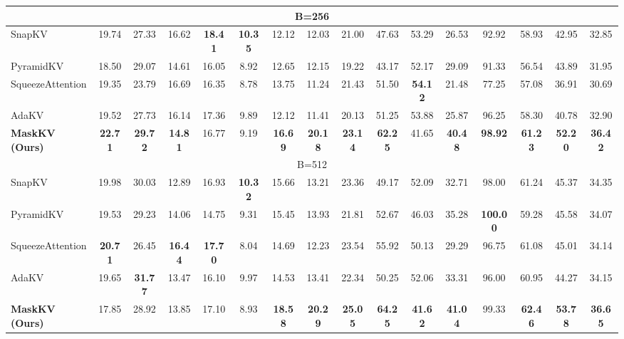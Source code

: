 \begin{table*}[t!]
{\begin{tabular}{@{}l*{15}{c}@{}}
        \midrule
        \multicolumn{16}{c}{\small B=256} \\
        \midrule
        SnapKV & 19.74 & 27.33 & 16.62 & \textbf{18.41} & \textbf{10.35} & 12.12 & 12.03 & 21.00 & 47.63 & 53.29 & 26.53 & 92.92 & 58.93 & 42.95 & 32.85 \\
        PyramidKV & 18.50 & 29.07 & 14.61 & 16.05 & 8.92 & 12.65 & 12.15 & 19.22 & 43.17 & 52.17 & 29.09 & 91.33 & 56.54 & 43.89 & 31.95 \\
        SqueezeAttention & 19.35 & 23.79 & 16.69 & 16.35 & 8.78 & 13.75 & 11.24 & 21.43 & 51.50 & \textbf{54.12} & 21.48 & 77.25 & 57.08 & 36.91 & 30.69 \\
        AdaKV & 19.52 & 27.73 & 16.14 & 17.36 & 9.89 & 12.12 & 11.41 & 20.13 & 51.25 & 53.88 & 25.87 & 96.25 & 58.30 & 40.78 & 32.90 \\
        \rowcolor{lightgreen} \textbf{MaskKV (Ours)} & \textbf{22.71} & \textbf{29.72} & \textbf{14.81} & 16.77 & 9.19 & \textbf{16.69} & \textbf{20.18} & \textbf{23.14} & \textbf{62.25} & 41.65 & \textbf{40.48} & \textbf{98.92} & \textbf{61.23} & \textbf{52.20} & \textbf{36.42} \\
        \midrule
        \multicolumn{16}{c}{\small B=512} \\
        \midrule
        SnapKV & 19.98 & 30.03 & 12.89 & 16.93 & \textbf{10.32} & 15.66 & 13.21 & 23.36 & 49.17 & 52.09 & 32.71 & 98.00 & 61.24 & 45.37 & 34.35 \\
        PyramidKV & 19.53 & 29.23 & 14.06 & 14.75 & 9.31 & 15.45 & 13.93 & 21.81 & 52.67 & 46.03 & 35.28 & \textbf{100.00} & 59.28 & 45.58 & 34.07 \\
        SqueezeAttention & \textbf{20.71} & 26.45 & \textbf{16.44} & \textbf{17.70} & 8.04 & 14.69 & 12.23 & 23.54 & 55.92 & 50.13 & 29.29 & 96.75 & 61.08 & 45.01 & 34.14 \\
        AdaKV & 19.65 & \textbf{31.77} & 13.47 & 16.10 & 9.97 & 14.53 & 13.41 & 22.34 & 50.25 & 52.06 & 33.31 & 96.00 & 60.95 & 44.27 & 34.15 \\
        \rowcolor{lightgreen} \textbf{MaskKV (Ours)} & 17.85 & 28.92 & 13.85 & 17.10 & 8.93 & \textbf{18.58} & \textbf{20.29} & \textbf{25.05} & \textbf{64.25} & \textbf{41.62} & \textbf{41.04} & 99.33 & \textbf{62.46} & \textbf{53.78} & \textbf{36.65} \\

        \bottomrule
    \end{tabular}
    } 
\end{table*}
